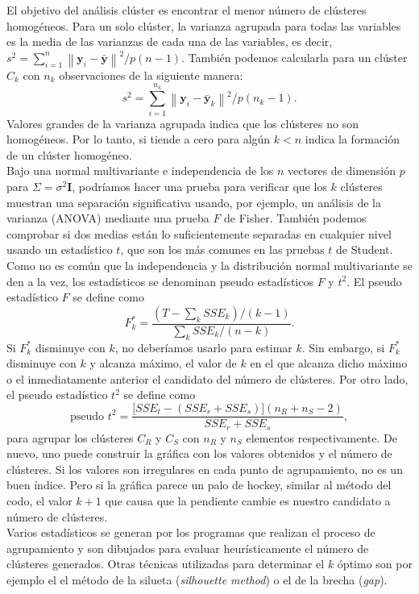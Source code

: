 \documentclass[a4paper, 20pt]{article}
\newcommand{\norm}[1]{\left\lVert#1\right\rVert}
\newcommand{\yy}{\textbf{y}}
\begin{document}
El objetivo del análisis clúster es encontrar el menor número de clústeres homogéneos. Para un solo clúster, la varianza agrupada para todas las variables es la media de las varianzas de cada una de las variables, es decir, $ s^2 = \sum_{i=1}^{n} \norm{\yy_i - \bar{\yy}}^2/ p(n-1)$. También podemos calcularla para un clúster $ C_k $ con $ n_k $ observaciones de la siguiente manera:
\[
s^2 = \sum_{i=1}^{n_k} \norm{\yy_i - \bar{\yy}_k}^2/ p(n_k-1).
\]
Valores grandes de la varianza agrupada indica que los clústeres no son homogéneos. Por lo tanto, si tiende a cero para algún $  k < n $ indica la formación de un clúster homogéneo. \\

Bajo una normal multivariante e independencia de los $ n $ vectores de dimensión $ p $ para $ \Sigma = \sigma^2 \textbf{I} $, podríamos hacer una prueba para verificar que los $ k $ clústeres muestran una separación significativa usando, por ejemplo, un análisis de la varianza (ANOVA) mediante una prueba $ F $ de Fisher. También podemos comprobar si dos medias están lo suficientemente separadas en cualquier nivel usando un estadístico $ t $, que son los más comunes en las pruebas $ t $ de Student. Como no es común que la independencia y la distribución normal multivariante se den a la vez, los estadísticos se denominan pseudo estadísticos $ F $ y  $ t^2 $. El pseudo estadístico $ F $ se define como
\[
F^*_k = \frac{(T-\sum_k SSE_k) / (k-1)}{\sum_k SSE_k / (n-k)}.
\]
Si $ F^*_k $ disminuye con $ k $, no deberíamos usarlo para estimar $ k $. Sin embargo, si $ F^*_k $ disminuye con $ k $ y alcanza máximo, el valor de $ k $ en el que alcanza dicho máximo o el inmediatamente anterior el candidato del número de clústeres. Por otro lado, el pseudo estadístico $ t^2 $ se define como
\[
\text{pseudo }t^2 = \frac{\lbrack SSE_t - (SSE_r + SSE_s)\rbrack(n_R + n_S - 2)}{SSE_r + SSE_s},
\]
para agrupar los clústeres $ C_R $ y $ C_S $ con $ n_R $ y $ n_S $ elementos respectivamente. De nuevo, uno puede construir la gráfica con los valores obtenidos y el número de clústeres. Si los valores son irregulares en cada punto de agrupamiento, no es un buen índice. Pero si la gráfica parece un palo de hockey, similar al método del codo, el valor $ k +1 $ que causa que la pendiente cambie es nuestro candidato a número de clústeres. \\

Varios estadísticos se generan por los programas que realizan el proceso de agrupamiento y son dibujados para evaluar heurísticamente el número de clústeres generados. Otras técnicas utilizadas para determinar el $ k $ óptimo son por ejemplo el el método de la silueta (\textit{silhouette method}) o el de la brecha (\textit{gap}).
\end{document}
